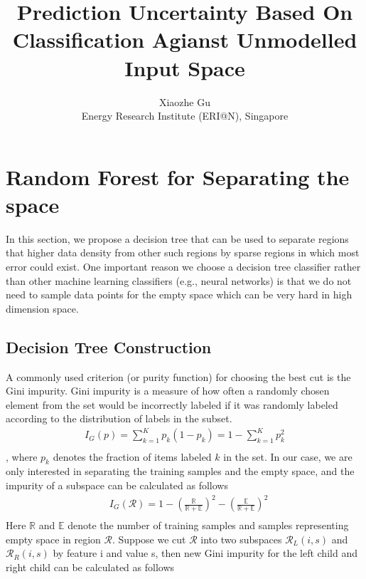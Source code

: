 \documentclass[11pt,onecolumn]{IEEEtran}
\begin{document}
     
\title{Prediction Uncertainty Based On Classification Agianst Unmodelled Input Space}
\author{Xiaozhe Gu\\Energy Research Institute (ERI@N), Singapore }

\maketitle

\section{Random Forest for Separating the space}
In this section, we propose a decision tree that can be used to separate regions that higher data density from other such regions by sparse regions in which most error could exist. One important reason we choose a decision tree classifier rather than other machine learning classifiers (e.g., neural networks) is that we do not need to sample data points for the empty space which can be very hard in high dimension space.
\subsection{Decision Tree Construction}

A commonly used criterion (or purity function) for choosing the best cut is the Gini impurity.  Gini impurity is a measure of how often a randomly chosen element from the set would be incorrectly labeled if it was randomly labeled according to the distribution of labels in the subset.  
\begin{align*}
I_G( p)=\sum_{k=1}^Kp_k(1-p_k)=1-\sum_{k=1}^K p_k^2\\
\end{align*}
, where $p_k$ denotes the fraction of items labeled $k$ in the set. In our case,  we are only interested in separating the training samples and the empty space, and the impurity of a subspace can be calculated as follows
\begin{align*}
& I_G(\mathcal R)=1-\left(\frac{\mathbb R}{\mathbb R+\mathbb E}\right)^2 -\left(\frac{\mathbb E}{\mathbb R+\mathbb E}\right)^2\\
\end{align*}
Here $\mathbb R$ and $\mathbb E$ denote the number of training samples and samples representing empty space  in region $\mathcal R$.   Suppose we cut $\mathcal R$ into two subspaces $\mathcal R_L(i,s)$ and $\mathcal R_R(i,s)$ by feature i and value s, then new Gini impurity  for the left child and right child can be calculated as follows
\end{document}
